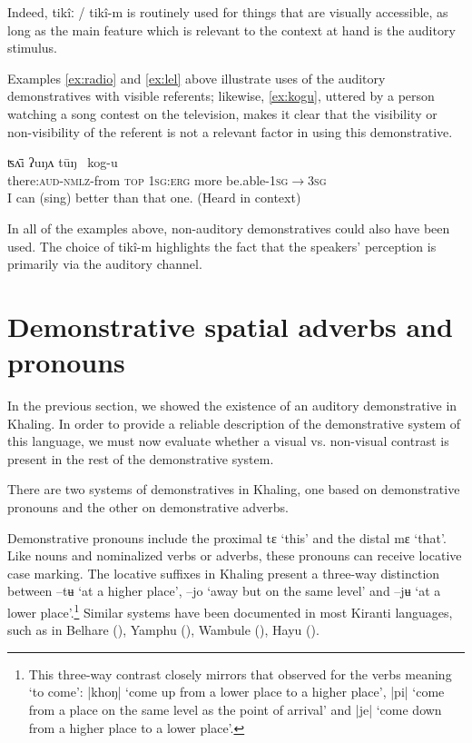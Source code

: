 \documentclass[oldfontcommands,oneside,a4paper,11pt]{article}
\newcommand{\ipa}[1]{{\phon \mbox{#1}}} %
\begin{document}
Indeed, \ipa{tikîː} / \ipa{tikî-m} is routinely used for things that are visually accessible, as long as the main feature which is relevant to the context at hand is the auditory stimulus.
 
Examples \ref{ex:radio} and \ref{ex:lel} above illustrate uses of the auditory demonstratives with visible referents; likewise,   \ref{ex:kogu}, uttered by a person watching a song contest on the television, makes it clear that the visibility or non-visibility of the referent is not a relevant factor in using this demonstrative.

\begin{exe}
\ex \label{ex:kogu}
\gll  	\ipa{tikî-m-kʌ}   	\ipa{ʦʌ̄i} \ipa{ʔuŋʌ} \ipa{tūŋ }   	\ipa{kog-u}   \\
there:\textsc{aud}-\textsc{nmlz}-from \textsc{top} \textsc{1sg:erg} more be.able-\textsc{1sg$\rightarrow$3sg}	  \\
\glt I can (sing) better than that one. (Heard in context)
\end{exe}

 

In all of the examples above, non-auditory demonstratives could also have been used. The choice of \ipa{tikî-m}  highlights the  fact that the  speakers' perception is primarily via the auditory channel.
 
 
 \section{Demonstrative spatial adverbs and pronouns} \label{sec:spatial}
In the previous section, we   showed the existence of an auditory demonstrative in Khaling. In order to provide a reliable description of the demonstrative system of this language, we must now evaluate whether a visual vs. non-visual contrast is present in the rest of the demonstrative system. 



There are two systems of demonstratives in Khaling, one based on demonstrative pronouns and the other   on demonstrative adverbs.

Demonstrative pronouns include the  proximal \ipa{tɛ} `this' and the distal \ipa{mɛ} `that'. Like nouns and nominalized verbs or adverbs, these pronouns can receive locative case marking. The locative suffixes  in Khaling present a three-way distinction between \ipa{--tʉ} `at a higher place', \ipa{--jo} `away but on the same level' and \ipa{--jʉ} `at a lower place'.\footnote{This three-way contrast closely mirrors that observed for the verbs meaning `to come': \ipa{|khoŋ|} `come up from a lower place to a higher place', \ipa{|pi|} `come from a place on the same level as the point of arrival' and \ipa{|je|} `come down from a higher place to a lower place'.} Similar systems have been documented in most Kiranti languages, such as in Belhare (\citealt{bickel01deictic}), Yamphu (\citealt[96-99]{rutgers98yamphu}), Wambule (\citealt[208-16]{opgenort04wambule}), Hayu (\citealt[121]{michailovsky88}).
\end{document}
